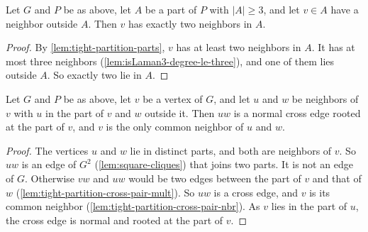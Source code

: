 \begin{lemma}
  \label{lem:normal-cross-count-local}
  \leanok
  Let $G$ and $P$ be as above, let $A$ be a part of $P$ with
  $|A| \ge 3$, and let $v \in A$ have a neighbor outside $A$. Then $v$
  has exactly two neighbors in $A$.
\end{lemma}
\begin{proof}
  \leanok
  By \cref{lem:tight-partition-parts}, $v$ has at least two neighbors in
  $A$. It has at most three neighbors
  (\cref{lem:isLaman3-degree-le-three}), and one of them lies outside
  $A$. So exactly two lie in $A$.
\end{proof}

\begin{lemma}
  \label{lem:normal-cross-count-producer}
  \leanok
  Let $G$ and $P$ be as above, let $v$ be a vertex of $G$, and let $u$
  and $w$ be neighbors of $v$ with $u$ in the part of $v$ and $w$
  outside it. Then $uw$ is a normal cross edge rooted at the part of
  $v$, and $v$ is the only common neighbor of $u$ and $w$.
\end{lemma}
\begin{proof}
  \leanok
  The vertices $u$ and $w$ lie in distinct parts, and both are neighbors
  of $v$. So $uw$ is an edge of $G^2$ (\cref{lem:square-cliques}) that
  joins two parts. It is not an edge of $G$. Otherwise $vw$ and $uw$
  would be two edges between the part of $v$ and that of $w$
  (\cref{lem:tight-partition-cross-pair-mult}). So $uw$ is a cross edge, and $v$ is its common neighbor
  (\cref{lem:tight-partition-cross-pair-nbr}). As $v$ lies in the part
  of $u$, the cross edge is normal and rooted at the part of $v$.
\end{proof}

